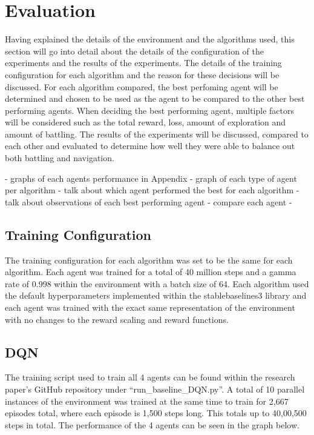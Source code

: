 \section{Evaluation}

Having explained the details of the environment and the algorithms used, this section will go into detail about the details of the configuration of the experiments and the results of the experiments. The details of the training configuration for each algorithm and the reason for these decisions will be discussed. For each algorithm compared, the best perfoming agent will be determined and chosen to be used as the agent to be compared to the other best performing agents. When deciding the best performing agent, multiple factors will be considered such as the total reward, loss, amount of exploration and amount of battling. The results of the experiments will be discussed, compared to each other and evaluated to determine how well they were able to balance out both battling and navigation.

- graphs of each agents performance in Appendix
- graph of each type of agent per algorithm
- talk about which agent performed the best for each algorithm
- talk about observations of each best performing agent 
- compare each agent 
- 

\subsection{Training Configuration}

The training configuration for each algorithm was set to be the same for each algorithm. Each agent was trained for a total of 40 million steps and a gamma rate of 0.998 within the environment with a batch size of 64. Each algorithm used the default hyperparameters implemented within the stablebaselines3 library and each agent was trained with the exact same representation of the environment with no changes to the reward scaling and reward functions. 

\subsection{DQN}

The training script used to train all 4 agents can be found within the research paper's GitHub repository under ``run\_baseline\_DQN.py''. A total of 10 parallel instances of the environment was trained at the same time to train for 2,667 episodes total, where each episode is 1,500 steps long. This totals up to 40,00,500 steps in total. The performance of the 4 agents can be seen in the graph below. 

